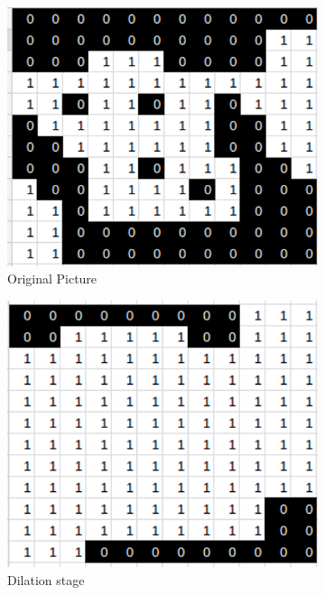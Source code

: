 \documentclass[11pt]{article}
\begin{document}
\begin{figure}
	\centering
	\begin{subfigure}{.32\textwidth}
		\centering
		\includegraphics[scale=0.27]{pics/closing_o}
		\caption{Original Picture}
	\end{subfigure}
	\hfill
	\begin{subfigure}{.32\textwidth}
		\centering
		\includegraphics[scale=0.27]{pics/closing_d}
		\caption{Dilation stage}
	\end{subfigure}
	\hfill
	\begin{subfigure}{.32\textwidth}

\end{subfigure}
\end{figure}
\end{document}
